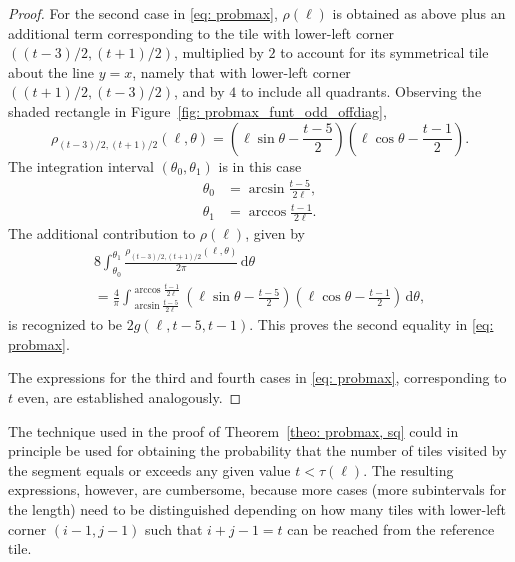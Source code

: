 \documentclass[12pt, a4paper]{article}
\newcommand{\diff}{\,\mathrm d}
\newcommand{\funt}{\tau} %
\newcommand{\probmax}{\rho} %
\newcommand{\len}{\ell} %
\newcommand{\tiles}{t} %
\begin{document}
\begin{proof}
For the second case in \eqref{eq: probmax}, $\probmax(\len)$ is obtained as above plus an additional term corresponding to the tile with lower-left corner $((\tiles-3)/2, (\tiles+1)/2)$, multiplied by $2$ to account for its symmetrical tile about the line $y=x$, namely that with lower-left corner $((\tiles+1)/2, (\tiles-3)/2)$, and by $4$ to include all quadrants. Observing the shaded rectangle in Figure~\ref{fig: probmax_funt_odd_offdiag},
\begin{equation}
\label{eq: probmax: probmax theta odd2}
\probmax_{(\tiles-3)/2, (\tiles+1)/2}(\len, \theta) = \left(\len\sin\theta - \frac{\tiles-5}2\right) \left(\len\cos\theta - \frac{\tiles-1}2\right).
\end{equation}
The integration interval $(\theta_0, \theta_1)$ is in this case
\begin{align}
\theta_0 & = \arcsin\frac{\tiles-5}{2\len}, \\
\theta_1 & = \arccos\frac{\tiles-1}{2\len}.
\end{align}
The additional contribution to $\probmax(\len)$, given by
\begin{multline}
8 \int_{\theta_0}^{\theta_1} \frac{\probmax_{(\tiles-3)/2, (\tiles+1)/2}(\len, \theta)}{2\pi} \diff \theta \\
= \frac 4 \pi \int_{\arcsin\frac{\tiles-5}{2\len}}^{\arccos\frac{\tiles-1}{2\len}} \left( \len\sin\theta - \frac{\tiles-5} 2 \right)  \left( \len\cos\theta - \frac{\tiles-1} 2 \right) \diff \theta,
\end{multline}
is recognized to be $2 g(\len, \tiles-5, \tiles-1)$. This proves the second equality in \eqref{eq: probmax}.

The expressions for the third and fourth cases in \eqref{eq: probmax}, corresponding to $\tiles$ even, are established analogously.
\end{proof}

The technique used in the proof of Theorem~\ref{theo: probmax, sq} could in principle be used for obtaining the probability that the number of tiles visited by the segment equals or exceeds any given value $\tiles < \funt(\len)$. The resulting expressions, however, are cumbersome, because more cases (more subintervals for the length) need to be distinguished depending on how many tiles with lower-left corner $(i-1,j-1)$ such that $i+j-1=\tiles$ can be reached from the reference tile.
\end{document}
